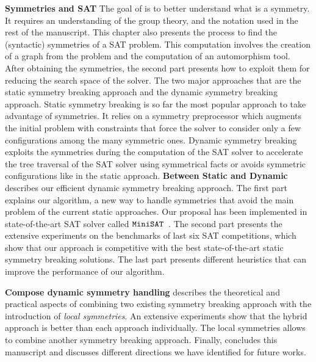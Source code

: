 \textbf{Symmetries and SAT}
The goal of  is to better understand what is a symmetry. 
It requires an understanding of the group theory, and the notation used in the rest of the manuscript.
This chapter also presents the process to find the (syntactic) symmetries of a SAT problem.
 This computation involves the creation of a graph from the problem and the computation of an
automorphism tool. After obtaining the symmetries, the second part presents how to
exploit them for reducing the search space of the solver. The two major approaches that
are the static symmetry breaking approach and the dynamic symmetry breaking approach.
Static symmetry breaking is so far the most popular approach to take advantage of symmetries. It relies on a symmetry preprocessor which augments the initial problem with constraints that force the solver to consider only a few configurations among the many symmetric ones.
Dynamic symmetry breaking exploits the symmetries during the computation of the SAT solver to accelerate the
tree traversal of the SAT solver using symmetrical facts or avoids symmetric configurations like in the 
static approach.
\textbf{Between Static and Dynamic}
 describes our efficient dynamic symmetry breaking approach.
The first part explains our algorithm, a new way to handle symmetries that avoid the main problem
of the current static approaches. Our proposal has been implemented in state-of-the-art
SAT solver called $\texttt{MiniSAT}$~\cite{een2003extensible}. The second part presents the extensive experiments on the benchmarks of last six SAT competitions,
which show that our approach is competitive with the best state-of-the-art static symmetry breaking solutions.
The last part presents different heuristics that can improve the performance of our algorithm.

\textbf{Compose dynamic symmetry handling}
 describes the theoretical and practical aspects of combining two existing
symmetry  breaking approach with the introduction of \textit{local symmetries}.
 An extensive experiments show that the hybrid approach is better than 
each approach individually. The local symmetries allows to combine another 
symmetry breaking approach.
Finally,  concludes this manuscript and discusses different directions we have identified for future works.
 
